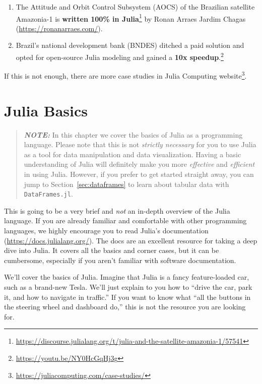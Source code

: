 \documentclass[
  notoc %
]{tufte-book}
\DeclareRobustCommand{\href}[2]{#2\footnote{\url{#1}}}
\newcommand{\passthrough}[1]{#1}
\begin{document}
\begin{enumerate}
  \href{https://web.archive.org/web/20210121164011/https://www.go-acop.org/abstract-awards}{won
  a quality award}.
\item
  \href{https://discourse.julialang.org/t/julia-and-the-satellite-amazonia-1/57541}{The
  Attitude and Orbit Control Subsystem (AOCS) of the Brazilian satellite
  Amazonia-1 is \textbf{written 100\% in Julia}} by Ronan Arraes Jardim
  Chagas (\url{https://ronanarraes.com/}).
\item
  \href{https://youtu.be/NY0HcGqHj3g}{Brazil's national development bank
  (BNDES) ditched a paid solution and opted for open-source Julia
  modeling and gained a \textbf{10x speedup}.}
\end{enumerate}

If this is not enough, there are more case studies in
\href{https://juliacomputing.com/case-studies/}{Julia Computing
website}.

\hypertarget{sec:julia_basics}{%
\chapter{Julia Basics}\label{sec:julia_basics}}

\begin{quote}
\textbf{\emph{NOTE:}} In this chapter we cover the basics of Julia as a
programming language. Please note that this is not \emph{strictly
necessary} for you to use Julia as a tool for data manipulation and data
visualization. Having a basic understanding of Julia will definitely
make you more \emph{effective} and \emph{efficient} in using Julia.
However, if you prefer to get started straight away, you can jump to
Section~\ref{sec:dataframes} to learn about tabular data with
\passthrough{\lstinline!DataFrames.jl!}.
\end{quote}

This is going to be a very brief and \emph{not} an in-depth overview of
the Julia language. If you are already familiar and comfortable with
other programming languages, we highly encourage you to read Julia's
documentation (\url{https://docs.julialang.org/}). The docs are an
excellent resource for taking a deep dive into Julia. It covers all the
basics and corner cases, but it can be cumbersome, especially if you
aren't familiar with software documentation.

We'll cover the basics of Julia. Imagine that Julia is a fancy
feature-loaded car, such as a brand-new Tesla. We'll just explain to you
how to ``drive the car, park it, and how to navigate in traffic.'' If
you want to know what ``all the buttons in the steering wheel and
dashboard do,'' this is not the resource you are looking for.
\end{document}
